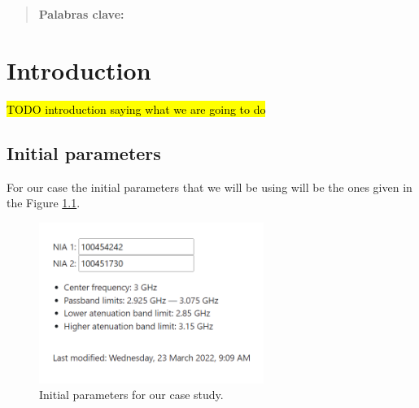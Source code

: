 \documentclass[12pt]{report} %
\newcommand{\todo}[1]{\sethlcolor{green}\hl{TODO #1}}
\begin{document}
\newpage %
\thispagestyle{empty}
\mbox{}

\renewcommand\abstractname{\large\bfseries\filcenter\uppercase{Resumen}}
\begin{abstract}
\thispagestyle{plain}
\setcounter{page}{3}
	
	
	\textbf{Palabras clave:}
	
	\vfill
\end{abstract}
	\newpage %
	\thispagestyle{empty}
	\mbox{}



\tableofcontents
\thispagestyle{fancy}

\newpage %
\thispagestyle{empty}


\clearpage
{} %

\chapter{Introduction}

\todo{introduction saying what we are going to do}

\section{Initial parameters}

For our case the initial parameters that we will be using will be the ones given in the Figure \ref{fig:introduction:initial_parameters}.

\begin{figure}[htbp]
    \centering
    \includegraphics[width=0.65\textwidth]{introduction/initial_parameters_calculator.png}
    \caption{Initial parameters for our case study.}
    \label{fig:introduction:initial_parameters}
\end{figure}
\end{document}
